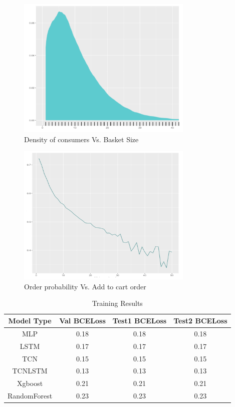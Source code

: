   \begin{figure}[t]
    \centering 
    \includegraphics[width=3.3in]{img/basket.png} 
    \caption{Density of consumers Vs. Basket Size} 
    \label{fig:basket} 
  \end{figure}

  \begin{figure}[t]
    \centering 
    \includegraphics[width=3.3in]{img/addtocart.png} 
    \caption{Order probability Vs. Add to cart order} 
    \label{fig:basket} 
  \end{figure}


\begin{table}[t]
\caption{ Training Results}
\vspace{0.1 in}
\centering
\resizebox{3.3in}{!}
{%
\begin{tabular}{|c|c|c|c|}
\hline
{\bf Model Type} & {\bf Val BCELoss} & {\bf Test1 BCELoss} & {\bf Test2 BCELoss} \\  \hline
MLP	  		&  0.18 &  0.18 &  0.18  \\ \hline
LSTM  		&  0.17 &  0.17 &  0.17 \\ \hline
TCN			&  0.15  &  0.15 &  0.15  \\ \hline
TCNLSTM 	& 0.13  & 0.13	& 0.13	 \\ \hline
Xgboost 	& 0.21 & 0.21	& 0.21	\\ \hline
RandomForest & 0.23 & 0.23	& 0.23	\\ \hline
\end{tabular}
}
\label{tab:training}
\end{table}


